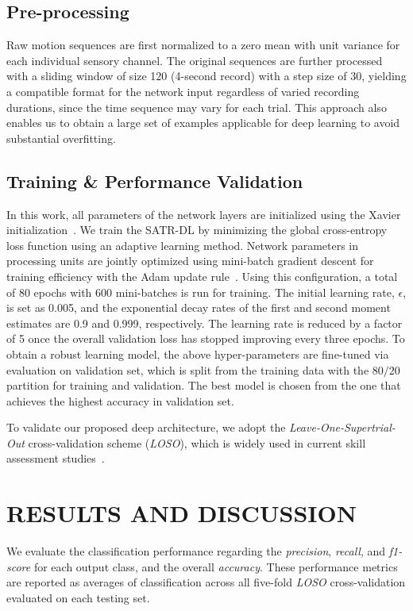 \documentclass[letterpaper, 10 pt, conference, twoside]{IEEEtran}
\begin{document}
\subsection{Pre-processing}
Raw motion sequences are first normalized to a zero mean with unit variance for each individual sensory channel. The original sequences are further processed with a sliding window of size 120 (4-second record) with a step size of 30, yielding a compatible format for the network input regardless of varied recording durations, since the time sequence may vary for each trial. This approach also enables us to obtain a large set of examples applicable for deep learning to avoid substantial overfitting. 

\subsection{Training \& Performance Validation}
In this work, all parameters of the network layers are initialized using the Xavier initialization~\cite{2015DL_review}.
We train the SATR-DL by minimizing the global cross-entropy loss function using an adaptive learning method. 
Network parameters in processing units are jointly optimized using mini-batch gradient descent for training efficiency with the Adam update rule~\cite{kingma2014adam}. Using this configuration, a total of 80 epochs with 600 mini-batches is run for training. The initial learning rate, $\epsilon$, is set as 0.005, and the exponential decay rates of the first and second moment estimates are 0.9 and 0.999, respectively. The learning rate is reduced by a factor of 5 once the overall validation loss has stopped improving every three epochs. To obtain a robust learning model, the above hyper-parameters are fine-tuned via evaluation on validation set, which is split from the training data with the $80/20$ partition for training and validation. The best model is chosen from the one that achieves the highest accuracy in validation set.

To validate our proposed deep architecture, we adopt the \textit{Leave-One-Supertrial-Out} cross-validation scheme (\textit{LOSO}), which is widely used in current skill assessment studies~\cite{gao2014JIGSAW}. 

\section{RESULTS AND DISCUSSION}
We evaluate the classification performance regarding the \textit{precision}, \textit{recall}, and \textit{f1-score} for each output class, and the overall \textit{accuracy}. These performance metrics are reported as averages of classification across all five-fold \textit{LOSO} cross-validation evaluated on each testing set. 
\end{document}
